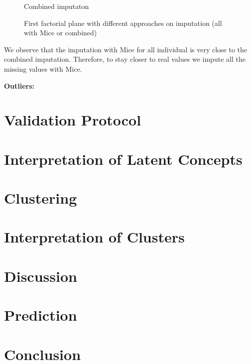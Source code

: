 \documentclass{article}
\begin{document}
\begin{figure}[H]
  \caption{Combined imputaton}\label{missing_contrib2}
\endminipage
\caption{First factorial plane with different approaches on imputation (all with Mice or combined)}
\end{figure}

We observe that the imputation with Mice for all individual is very close to the combined imputation. Therefore, to stay closer to real values we impute all the missing values with Mice.

\textbf{Outliers:}

\section{Validation Protocol}

\section{Interpretation of Latent Concepts}

\section{Clustering}

\section{Interpretation of Clusters}

\section{Discussion}

\section{Prediction}

\section{Conclusion}
\end{document}
